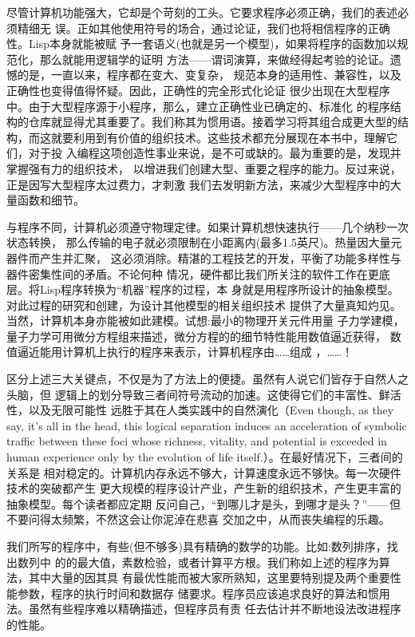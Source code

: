 \documentclass[11pt]{article}
\begin{document}
尽管计算机功能强大，它却是个苛刻的工头。它要求程序必须正确，我们的表述必须精细无
误。正如其他使用符号的场合，通过论证，我们也将相信程序的正确性。Lisp本身就能被赋
予一套语义(也就是另一个模型)，如果将程序的函数加以规范化，那么就能用逻辑学的证明
方法——谓词演算，来做经得起考验的论证。遗憾的是，一直以来，程序都在变大、变复杂，
规范本身的适用性、兼容性，以及正确性也变得值得怀疑。因此，正确性的完全形式化论证
很少出现在大型程序中。由于大型程序源于小程序，那么，建立正确性业已确定的、标准化
的程序结构的仓库就显得尤其重要了。我们称其为惯用语。接着学习将其组合成更大型的结
构，而这就要利用到有价值的组织技术。这些技术都充分展现在本书中，理解它们，对于投
入编程这项创造性事业来说，是不可或缺的。最为重要的是，发现并掌握强有力的组织技术，
以增进我们创建大型、重要之程序的能力。反过来说，正是因写大型程序太过费力，才刺激
我们去发明新方法，来减少大型程序中的大量函数和细节。

与程序不同，计算机必须遵守物理定律。如果计算机想快速执行——几个纳秒一次状态转换，
那么传输的电子就必须限制在小距离内(最多1.5英尺)。热量因大量元器件而产生并汇聚，
这必须消除。精湛的工程技艺的开发，平衡了功能多样性与器件密集性间的矛盾。不论何种
情况，硬件都比我们所关注的软件工作在更底层。将Lisp程序转换为“机器”程序的过程，本
身就是用程序所设计的抽象模型。对此过程的研究和创建，为设计其他模型的相关组织技术
提供了大量真知灼见。当然，计算机本身亦能被如此建模。试想:最小的物理开关元件用量
子力学建模，量子力学可用微分方程组来描述，微分方程的的细节特性能用数值逼近获得，
数值逼近能用计算机上执行的程序来表示，计算机程序由……组成 ，……！

区分上述三大关键点，不仅是为了方法上的便捷。虽然有人说它们皆存于自然人之头脑，但
逻辑上的划分导致三者间符号流动的加速。这使得它们的丰富性、鲜活性，以及无限可能性
远胜于其在人类实践中的自然演化（Even though, as they say, it's all in the head,
this logical separation induces an acceleration of symbolic traffic between
these foci whose richness, vitality, and potential is exceeded in human
experience only by the evolution of life itself.）。在最好情况下，三者间的关系是
相对稳定的。计算机内存永远不够大，计算速度永远不够快。每一次硬件技术的突破都产生
更大规模的程序设计产业，产生新的组织技术，产生更丰富的抽象模型。每个读者都应定期
反问自己，“到哪儿才是头，到哪才是头？”——但不要问得太频繁，不然这会让你泥淖在悲喜
交加之中，从而丧失编程的乐趣。

我们所写的程序中，有些(但不够多)具有精确的数学的功能。比如:数列排序，找出数列中
的的最大值，素数检验，或者计算平方根。我们称如上述的程序为算法，其中大量的因其具
有最优性能而被大家所熟知，这里要特别提及两个重要性能参数，程序的执行时间和数据存
储要求。程序员应该追求良好的算法和惯用法。虽然有些程序难以精确描述，但程序员有责
任去估计并不断地设法改进程序的性能。
\end{document}
